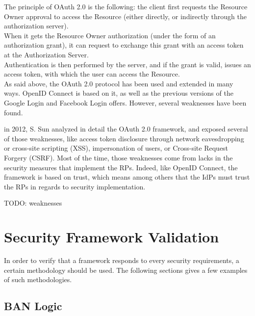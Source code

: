 The principle of OAuth 2.0 is the following: the client first requests the Resource Owner approval to access the Resource (either directly, or indirectly through the authorization server). 
\\When it gets the Resource Owner authorization (under the form of an authorization grant), it can request to exchange this grant with an access token at the Authorization Server. 
\\Authentication is then performed by the server, and if the grant is valid, issues an access token, with which the user can access the Resource.
\\

As said above, the OAuth 2.0 protocol has been used and extended in many ways. OpenID Connect is based on it, as well as the previous versions of the Google Login and Facebook Login offers. However, several weaknesses have been found.

in 2012, S. Sun analyzed in detail the OAuth 2.0 framework, and exposed several of those weaknesses\cite{Sun2012}, like access token disclosure through network eavesdropping or cross-site scripting (XSS), impersonation of users, or Cross-site Request Forgery (CSRF). Most of the time, those weaknesses come from lacks in the security measures that implement the RPs. Indeed, like OpenID Connect, the framework is based on trust, which means among others that the IdPs must trust the RPs in regards to security implementation.

{\huge TODO: weaknesses}

\section{Security Framework Validation}
In order to verify that a framework responds to every security requirements, a certain methodology should be used. The following sections gives a few examples of such methodologies.

\subsection{BAN Logic}
